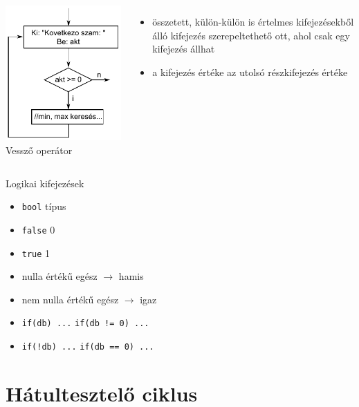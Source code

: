 \documentclass[usenames,dvipsnames,aspectratio=169]{beamer}
\begin{document}
\begin{frame}
  \begin{columns}[c]
      \includegraphics{vesszo.pdf}
      Vessző operátor
      \begin{itemize}
        \item összetett, külön-külön is értelmes kifejezésekből álló kifejezés szerepeltethető ott, ahol csak egy kifejezés állhat
        \item a kifejezés értéke az utolsó részkifejezés értéke
      \end{itemize}
  \end{columns}
\end{frame}

\begin{frame}
  Logikai kifejezések
  \begin{itemize}
    \item \texttt{bool} típus
    \item \texttt{false} \kiemel{$\equiv$} 0
    \item \texttt{true} \kiemel{$\equiv$} 1
    \item nulla értékű egész $\to$ hamis
    \item nem nulla értékű egész $\to$ igaz
    \item \texttt{if(db) ...} \kiemel{$\equiv$} \texttt{if(db != 0) ...}
    \item \texttt{if(!db) ...} \kiemel{$\equiv$} \texttt{if(db == 0) ...}
  \end{itemize}
\end{frame}

\section{Hátultesztelő ciklus}
\end{document}
